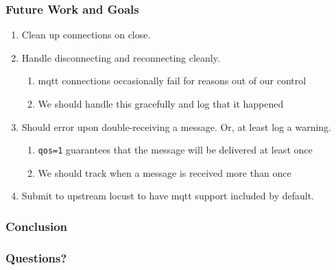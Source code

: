 \documentclass{beamer}
\begin{document}
\begin{frame}
    \frametitle{Future Work and Goals}
    \begin{enumerate}
        \item
            Clean up connections on close.
        \item
            Handle disconnecting and reconnecting cleanly.
            \begin{enumerate}
                \item
                    mqtt connections occasionally fail for reasons out of our
                    control
                \item We should handle this gracefully and log that it happened
            \end{enumerate}
        \item
            Should error upon double-receiving a message. Or, at least log a
            warning.
            \begin{enumerate}
                \item
                    \texttt{qos=1} guarantees that the message will be
                    delivered at least once
                \item We should track when a message is received more than once
            \end{enumerate}
        \item
            Submit to upstream locust to have mqtt support included by default.
    \end{enumerate}
\end{frame}

\begin{frame}
    \frametitle{Conclusion}
\end{frame}

\begin{frame}
    \frametitle{Questions?}
\end{frame}
\end{document}
